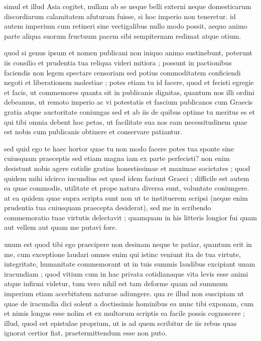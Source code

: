  simul et illud Asia cogitet, nullam ab se neque belli externi neque domesticarum discordiarum calamitatem afuturam fuisse, si hoc imperio non teneretur. id autem imperium cum retineri sine vectigalibus nullo modo possit, aequo animo parte aliqua suorum fructuum pacem sibi sempiternam redimat atque otium.

 quod si genus ipsum et nomen publicani non iniquo animo sustinebunt, poterunt iis consilio et prudentia tua reliqua videri mitiora ; possunt in pactionibus faciendis non legem spectare censoriam sed potius commoditatem conficiendi negoti et liberationem molestiae ; potes etiam tu id facere, quod et fecisti egregie et facis, ut commemores quanta sit in publicanis dignitas, quantum nos illi ordini debeamus, ut remoto imperio ac vi potestatis et fascium publicanos cum Graecis gratia atque auctoritate coniungas sed et ab iis de quibus optime tu meritus es et qui tibi omnia debent hoc petas, ut facilitate sua nos eam necessitudinem quae est nobis cum publicanis obtinere et conservare patiantur.

 sed quid ego te haec hortor quae tu non modo facere potes tua sponte sine cuiusquam praeceptis sed etiam magna iam ex parte perfecisti? non enim desistunt nobis agere cotidie gratias honestissimae et maximae societates ; quod quidem mihi idcirco iucundius est quod idem faciunt Graeci ; difficile est autem ea quae commodis, utilitate et prope natura diversa sunt, voluntate coniungere. at ea quidem quae supra scripta sunt non ut te instituerem scripsi (neque enim prudentia tua cuiusquam praecepta desiderat), sed me in scribendo commemoratio tuae virtutis delectavit ; quamquam in his litteris longior fui quam aut vellem aut quam me putavi fore.

 unum est quod tibi ego praecipere non desinam neque te patiar, quantum erit in me, cum exceptione laudari omnes enim qui istinc veniunt ita de tua virtute, integritate, humanitate commemorant ut in tuis summis laudibus excipiant unam iracundiam ; quod vitium cum in hac privata cotidianaque vita levis esse animi atque infirmi videtur, tum vero nihil est tam deforme quam ad summum imperium etiam acerbitatem naturae adiungere. qua re illud non suscipiam ut quae de iracundia dici solent a doctissimis hominibus ea nunc tibi exponam, cum et nimis longus esse nolim et ex multorum scriptis ea facile possis cognoscere ; illud, quod est epistulae proprium, ut is ad quem scribitur de iis rebus quas ignorat certior fiat, praetermittendum esse non puto.

